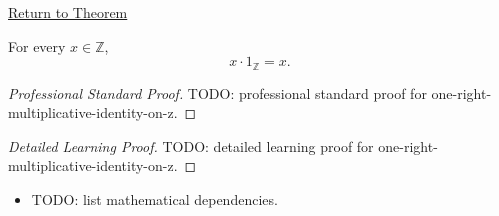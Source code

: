 \newpage
{}
\label{prf:one-right-multiplicative-identity-on-z}

\begin{remark*}[Return]
\hyperref[cor:one-right-multiplicative-identity-on-z]{Return to Theorem}
\end{remark*}

\begin{corollary*}
For every $x\in\mathbb{Z}$,
\[
x\cdot 1_{\mathbb{Z}}=x.
\]
\end{corollary*}

\begin{proof}[Professional Standard Proof]
\LRAProofBodyStart
TODO: professional standard proof for one-right-multiplicative-identity-on-z.
\end{proof}

\begin{proof}[Detailed Learning Proof]
\LRAProofBodyStart
TODO: detailed learning proof for one-right-multiplicative-identity-on-z.
\end{proof}

\begin{remark*}
\end{remark*}

\begin{dependencies}
\begin{itemize}
  \item TODO: list mathematical dependencies.
\end{itemize}
\end{dependencies}

\clearpage
